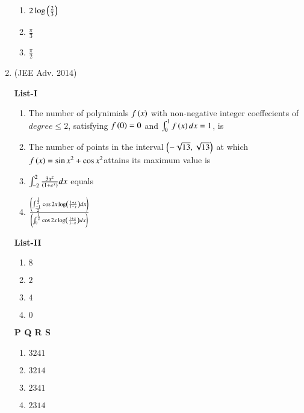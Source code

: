 \documentclass[journal,12pt,onecolumn]{IEEEtran}
\theoremstyle{remark}
\begin{document}
\begin{enumerate}
\begin{multicols}{2}
\begin{enumerate}
					\item $2\log\left(\frac{2}{3}\right)$

					\item $\frac{\pi}{3}$

					\item $\frac{\pi}{2}$
				\end{enumerate}
			\end{multicols}


		\item 
			\hfill{(JEE Adv. 2014)}
			\begin{multicols}{2}
				\textbf{List-I} 
				\begin{enumerate}
					\item The number of polynimials $f\left(x\right)$ with non-negative integer coeffecients of $degree \leq 2$, satisfying $f\left(0\right)=0$ and $\int_{0}^{1}f\left(x\right)dx=1$, is
					\item The number of points in the interval $\left(-\sqrt{13},\sqrt{13}\right)$ at which $f\left(x\right)= \sin x^{2}+\cos x^{2}$attains its maximum value is
					\item $\int_{-2}^{2}\frac{3x^{2}}{\left(1+e^{x}\right)}dx$ equals
					\item $\frac{\left(\int_{\frac{-1}{2}}^{\frac{1}{2}}\cos 2x\log\left(\frac{1+x}{1-x}\right)dx\right)}{\left(\int_{0}^{\frac{1}{2}}\cos 2x\log\left(\frac{1+x}{1-x}\right)dx\right)}$
				\end{enumerate}
				\columnbreak
				\textbf{List-II}
				\begin{enumerate}
					\item $8$

					\item $2$

					\item $4$

					\item $0$
				\end{enumerate}
		\end{multicols}
			\textbf{   P Q R S}
			\begin{enumerate}
		
				\item $3 2 4 1$
				\item $3 2 1 4$
				\item $2 3 4 1$
				\item $2 3 1 4$
			\end{enumerate}
	\end{enumerate}
\end{document}
